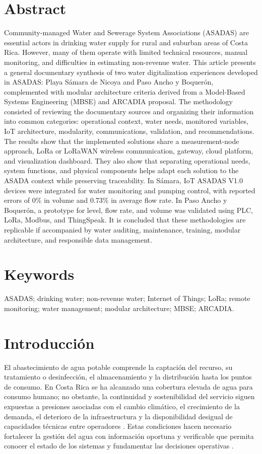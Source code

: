 \documentclass[12pt,letterpaper]{article}
\begin{document}
\section{Abstract}
Community-managed Water and Sewerage System Associations (ASADAS) are essential actors in drinking water supply for rural and suburban areas of Costa Rica. However, many of them operate with limited technical resources, manual monitoring, and difficulties in estimating non-revenue water. This article presents a general documentary synthesis of two water digitalization experiences developed in ASADAS: Playa Sámara de Nicoya and Paso Ancho y Boquerón, complemented with modular architecture criteria derived from a Model-Based Systems Engineering (MBSE) and ARCADIA proposal. The methodology consisted of reviewing the documentary sources and organizing their information into common categories: operational context, water needs, monitored variables, IoT architecture, modularity, communications, validation, and recommendations. The results show that the implemented solutions share a measurement-node approach, LoRa or LoRaWAN wireless communication, gateway, cloud platform, and visualization dashboard. They also show that separating operational needs, system functions, and physical components helps adapt each solution to the ASADA context while preserving traceability. In Sámara, IoT ASADAS V1.0 devices were integrated for water monitoring and pumping control, with reported errors of 0\% in volume and 0.73\% in average flow rate. In Paso Ancho y Boquerón, a prototype for level, flow rate, and volume was validated using PLC, LoRa, Modbus, and ThingSpeak. It is concluded that these methodologies are replicable if accompanied by water auditing, maintenance, training, modular architecture, and responsible data management.

\section{Keywords}
ASADAS; drinking water; non-revenue water; Internet of Things; LoRa; remote monitoring; water management; modular architecture; MBSE; ARCADIA.

\section{Introducción}
El abastecimiento de agua potable comprende la captación del recurso, su tratamiento o desinfección, el almacenamiento y la distribución hasta los puntos de consumo. En Costa Rica se ha alcanzado una cobertura elevada de agua para consumo humano; no obstante, la continuidad y sostenibilidad del servicio siguen expuestas a presiones asociadas con el cambio climático, el crecimiento de la demanda, el deterioro de la infraestructura y la disponibilidad desigual de capacidades técnicas entre operadores \cite{mora2021,paniagua2019,kapelan2020}. Estas condiciones hacen necesario fortalecer la gestión del agua con información oportuna y verificable que permita conocer el estado de los sistemas y fundamentar las decisiones operativas \cite{kapelan2020}.
\end{document}
